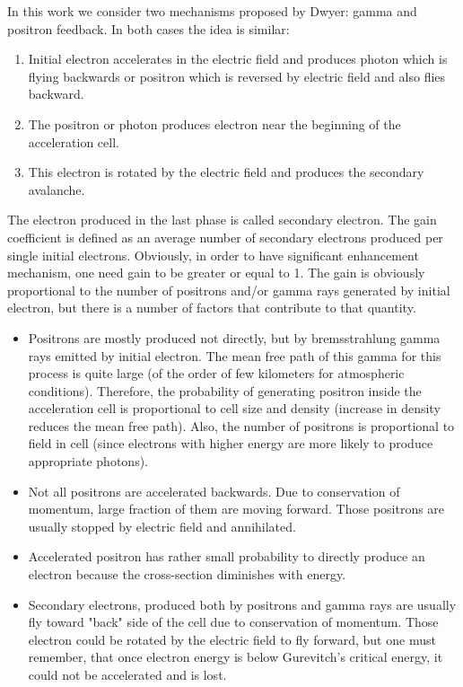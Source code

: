 \documentclass[utf8]{webofc}
\begin{document}
    In this work we consider two mechanisms proposed by Dwyer: gamma and positron feedback. 
    In both cases the idea is similar:
    \begin{enumerate}
        
        \item Initial electron accelerates in the electric field and produces photon which is flying backwards or positron which is reversed by electric field and also flies backward.
        
        \item The positron or photon produces electron near the beginning of the acceleration cell.
        
        \item This electron is rotated by the electric field and produces the secondary avalanche. 
        
    \end{enumerate}
    
    The electron produced in the last phase is called secondary electron. The gain coefficient is defined as an average number of secondary electrons produced per single initial electrons. Obviously, in order to have significant enhancement mechanism, one need gain to be greater or equal to 1. 
    The gain is obviously proportional to the number of positrons and/or gamma rays generated by initial electron, but there is a number of factors that contribute to that quantity.
    
    \begin{itemize}
        \item Positrons are mostly produced not directly, but by bremsstrahlung gamma rays emitted by initial electron. The mean free path of this gamma for this process is quite large (of the order of few kilometers for atmospheric conditions). Therefore, the probability of generating positron inside the acceleration cell is proportional to cell size and density (increase in density reduces the mean free path). Also, the number of positrons is proportional to field in cell (since electrons with higher energy are more likely to produce appropriate photons).
        \item Not all positrons are accelerated backwards. Due to conservation of momentum, large fraction of them are moving forward. Those positrons are usually stopped by electric field and annihilated.
        \item Accelerated positron has rather small probability to directly produce an electron because the cross-section diminishes with energy.
        \item Secondary electrons, produced both by positrons and gamma rays are usually fly toward "back" side of the cell due to conservation of momentum. Those electron could be rotated by the electric field to fly forward, but one must remember, that once electron energy is below Gurevitch's critical energy, it could not be accelerated and is lost.
    \end{itemize}
    
\end{document}
